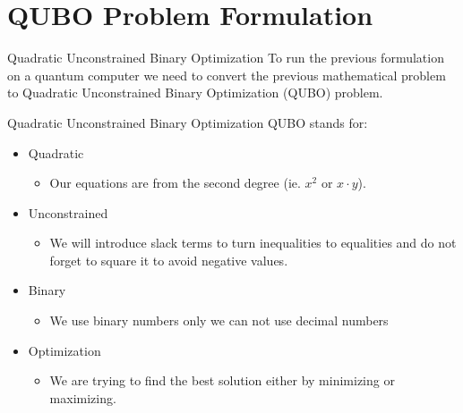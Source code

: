 \documentclass[14pt, aspectratio=169]{beamer}
\begin{document}
\section{QUBO Problem Formulation}

\begin{frame}{Quadratic Unconstrained Binary Optimization }
    To run the previous formulation on a quantum computer we need to convert the previous mathematical problem to Quadratic Unconstrained Binary Optimization (QUBO) problem.\\
\end{frame}

\begin{frame}{Quadratic Unconstrained Binary Optimization }
    QUBO stands for:
    \begin{itemize}
        \item Quadratic
              \begin{itemize}
                  \item Our equations are from the second degree (ie. $x^2$ or $x\cdot y$).
              \end{itemize}
              \vspace{2mm}
        \item Unconstrained
              \begin{itemize}
                  \item We will introduce slack terms to turn inequalities to equalities and do not forget to square it to avoid negative values.
              \end{itemize}
              \vspace{2mm}
        \item Binary
              \begin{itemize}
                  \item We use binary numbers only we can not use decimal numbers
              \end{itemize}
              \vspace{2mm}
        \item Optimization
              \begin{itemize}
                  \item We are trying to find the best solution either by minimizing or maximizing.
              \end{itemize}
    \end{itemize}
\end{frame}
\end{document}
